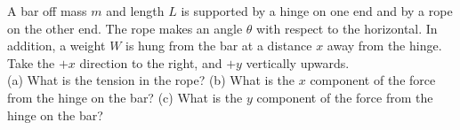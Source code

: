 A bar off mass $m$ and length $L$ is supported by a hinge on one end
and by a rope on the other end. The rope makes an angle $\theta$ with
respect to the horizontal. In addition, a weight $W$ is hung from the bar at a
distance $x$ away from the hinge. Take the $+x$ direction to the
right, and $+y$ vertically upwards.\\
%
(a) What is the tension in the rope?\answercheck\hwendpart
%
(b) What is the $x$ component of the force from the hinge on the
bar?\answercheck\hwendpart
%
(c) What is the $y$ component of the force from the hinge on the bar?\answercheck
